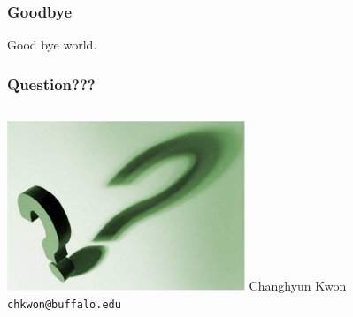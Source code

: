 \documentclass[xcolor=dvipsnames, unicode]{beamer}
\begin{document}

\begin{frame}
\frametitle{Goodbye}

Good bye world.

\end{frame}




\begin{frame}
\frametitle{Question???}
\begin{columns}[c]
\column{1.5in}
    \includegraphics[height=2in]{question}
\column{1.5in}
    Changhyun Kwon\\
    \texttt{chkwon@buffalo.edu}
\end{columns}
\end{frame}


%
%
\end{document}
